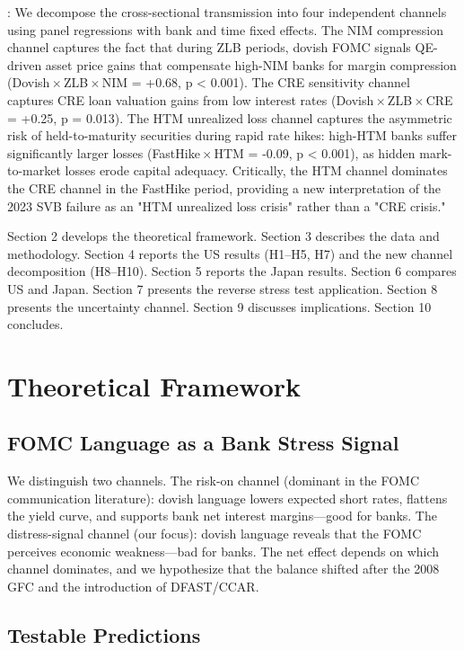\documentclass[12pt,a4paper]{article}
\begin{document}
: We decompose the cross-sectional transmission into four independent channels using panel regressions with bank and time fixed effects. The NIM compression channel captures the fact that during ZLB periods, dovish FOMC signals QE-driven asset price gains that compensate high-NIM banks for margin compression (Dovish\,$\times$\,ZLB\,$\times$\,NIM = +0.68, p < 0.001). The CRE sensitivity channel captures CRE loan valuation gains from low interest rates (Dovish\,$\times$\,ZLB\,$\times$\,CRE = +0.25, p = 0.013). The HTM unrealized loss channel captures the asymmetric risk of held-to-maturity securities during rapid rate hikes: high-HTM banks suffer significantly larger losses (FastHike\,$\times$\,HTM = -0.09, p < 0.001), as hidden mark-to-market losses erode capital adequacy. Critically, the HTM channel dominates the CRE channel in the FastHike period, providing a new interpretation of the 2023 SVB failure as an "HTM unrealized loss crisis" rather than a "CRE crisis."

Section 2 develops the theoretical framework. Section 3 describes the data and methodology. Section 4 reports the US results (H1–H5, H7) and the new channel decomposition (H8–H10). Section 5 reports the Japan results. Section 6 compares US and Japan. Section 7 presents the reverse stress test application. Section 8 presents the uncertainty channel. Section 9 discusses implications. Section 10 concludes.

\section{Theoretical Framework}

\subsection{FOMC Language as a Bank Stress Signal}

We distinguish two channels. The risk-on channel (dominant in the FOMC communication literature): dovish language lowers expected short rates, flattens the yield curve, and supports bank net interest margins—good for banks. The distress-signal channel (our focus): dovish language reveals that the FOMC perceives economic weakness—bad for banks. The net effect depends on which channel dominates, and we hypothesize that the balance shifted after the 2008 GFC and the introduction of DFAST/CCAR.

\subsection{Testable Predictions}
\end{document}
